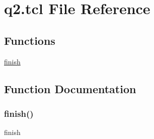 \hypertarget{q2_8tcl}{}\section{q2.\+tcl File Reference}
\label{q2_8tcl}
\subsection*{Functions}
\begin{DoxyCompactItemize}
\item 
\hyperlink{q2_8tcl_a30728837c246b65ef76298af0101d99c}{finish}
\end{DoxyCompactItemize}


\subsection{Function Documentation}
\mbox{\label{q2_8tcl_a30728837c246b65ef76298af0101d99c}} 
\subsubsection{\texorpdfstring{finish()}{finish()}}
{\footnotesize\ttfamily finish}

